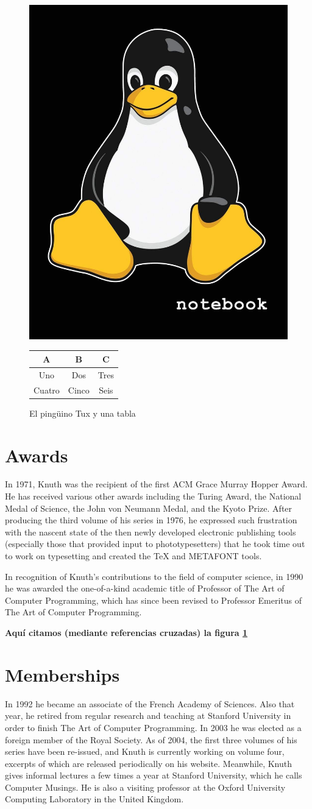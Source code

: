 \documentclass[a4paper,11pt]{article}
\begin{document}
\begin{figure}[t]
\begin{center} 
\bigskip
\includegraphics[height=0.25\textwidth]{Images/linux-logo.jpg} \hspace{5mm}
\begin{tabular}[b]{|c|c|c|}
\hline
A & B & C  \\ \hline
Uno & Dos & Tres \\
Cuatro & Cinco & Seis \\ \hline
\end{tabular}
\end{center}
\vspace{-5mm}
\caption{El pingüino Tux y una tabla}
\label{tux}
\end{figure}

\section{Awards}
In 1971, Knuth was the recipient of the first ACM Grace Murray Hopper 
Award. He has received various other awards including the Turing Award, 
the National Medal of Science, the John von Neumann Medal, and the Kyoto 
Prize. After producing the third volume of his series in 1976, he 
expressed such frustration with the nascent state of the then newly 
developed electronic publishing tools (especially those that provided 
input to phototypesetters) that he took time out to work on typesetting 
and created the TeX and METAFONT tools.

In recognition of Knuth's contributions to the field of computer science, 
in 1990 he was awarded the one-of-a-kind academic title of Professor of 
The Art of Computer Programming, which has since been revised to Professor 
Emeritus of The Art of Computer Programming.

\textbf{Aquí citamos (mediante referencias cruzadas) la figura \ref{tux}}

\section{Memberships}
In 1992 he became an associate of the French Academy of Sciences. Also
 that year, he retired from regular research and teaching at Stanford 
University in order to finish The Art of Computer Programming. In 2003 
he was elected as a foreign member of the Royal Society. As of 2004, 
the first three volumes of his series have been re-issued, and Knuth is 
currently working on volume four, excerpts of which are released periodically 
on his website. Meanwhile, Knuth gives informal lectures a few times a 
year at Stanford University, which he calls Computer Musings. He is also a 
visiting professor at the Oxford University Computing Laboratory in the 
United Kingdom.
\end{document}
